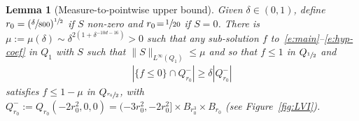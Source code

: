 \documentclass[11pt]{article}
\numberwithin{equation}{section}\let\oldbigcup\bigcup
\newtheorem{lemma}[theorem]{Lemma}
\theoremstyle{definition}
\theoremstyle{remark}
\begin{document}
\begin{lemma}[Measure-to-pointwise upper bound]
\label{l:increase}
Given $\delta \in (0,1)$, define
$r_0 = (\sfrac{\delta}{800})^{\sfrac12}$ if $S$ non-zero and
$r_0\!=\!\sfrac{1}{20}$ if $S\!=\!0$. There is
\hbox{$\mu\!:=\!\mu(\delta)\sim \delta^{2 (1+\delta^{-10d-16})}\!>\!0$} such
that any sub-solution $f$ to~\eqref{e:main}--\eqref{e:hyp-coef}
in $Q_1$ with $S$ such that
$\| S\|_{L^{\infty}(Q_1)}\le \mu$ and so that $f\leq 1$ in
$Q_{\sfrac{1}{2}}$ and
\begin{align}
\label{eq:measure-hyp-pointwise}
\left| \{ f \leq 0 \} \cap Q_{r_0}^- \right| \ge \delta
\left| Q_{r_0}^- \right|
\end{align}
satisfies $f \le 1-\mu$ in $Q_{\sfrac{r_0}{2}}$, with
$Q_{r_0}^{-} := Q_{r_0}(-2r_0^2,0,0) =(-3r_0^2,-2r_0^2] \times
B_{r_0^3} \times B_{r_0}$ (see Figure~\ref{fig:LVI}).
\end{lemma}
\end{document}
